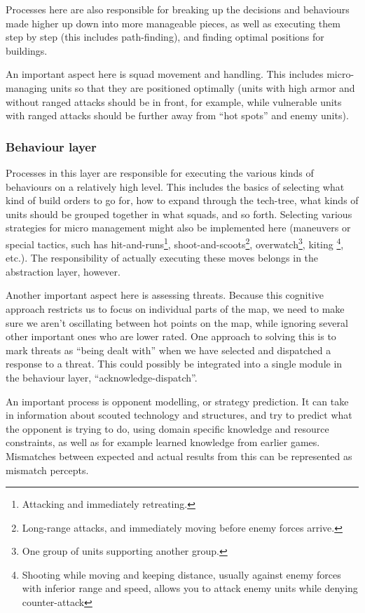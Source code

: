 Processes here are also responsible for breaking up the decisions and behaviours
made higher up down into more manageable pieces, as well as executing them step
by step (this includes path-finding), and finding optimal positions for
buildings.

An important aspect here is squad movement and handling. This includes
micro-managing units so that they are positioned optimally (units with high
armor and without ranged attacks should be in front, for example, while
vulnerable units with ranged attacks should be further away from ``hot spots''
and enemy units).

\subsubsection{Behaviour layer}
Processes in this layer are responsible for executing the various kinds of
behaviours on a relatively high level. This includes the basics of selecting
what kind of build orders to go for, how to expand through the tech-tree, what
kinds of units should be grouped together in what squads, and so forth.
Selecting various strategies for micro management might also be implemented here
(maneuvers or special tactics, such has hit-and-runs\footnote{Attacking and
immediately retreating.}, shoot-and-scoots\footnote{Long-range attacks, and
immediately moving before enemy forces arrive.}, overwatch\footnote{One group of
units supporting another group.}, kiting \footnote{Shooting while moving and
keeping distance, usually against enemy forces with inferior range and speed,
allows you to attack enemy units while denying counter-attack}, etc.). The
responsibility of actually executing these moves belongs in the abstraction
layer, however.

Another important aspect here is assessing threats. Because this cognitive
approach restricts us to focus on individual parts of the map, we need to make
sure we aren't oscillating between hot points on the map, while ignoring
several other important ones who are lower rated. One approach to
solving this is to mark threats as ``being dealt with'' when we have selected
and dispatched a response to a threat. This could possibly be integrated into a
single module in the behaviour layer, ``acknowledge-dispatch''.

An important process is opponent modelling, or strategy prediction. It can take
in information about scouted technology and structures, and try to predict what
the opponent is trying to do, using domain specific knowledge and resource
constraints, as well as for example learned knowledge from earlier games.
Mismatches between expected and actual results from this can be represented as
mismatch percepts.


